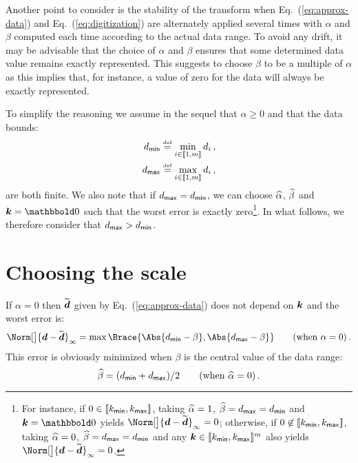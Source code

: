 \documentclass[]{article}
\newcommand*{\IntRange}[1]{[\![#1]\!]}
\renewcommand*{\proxy}[1]{\widetilde{#1}}
\begin{document}
Another point to consider is the stability of the transform when
Eq.~(\ref{eq:approx-data}) and Eq.~(\ref{eq:digitization}) are alternately
applied several times with $\alpha$ and $\beta$ computed each time according to
the actual data range.  To avoid any drift, it may be advisable that the choice
of $\alpha$ and $\beta$ ensures that some determined data value remains exactly
represented.  This suggests to choose $\beta$ to be a multiple of $\alpha$ as
this implies that, for instance, a value of zero for the data will always be
exactly represented.   

To simplify the reasoning we assume in the sequel that $\alpha \ge 0$ and that
the data bounds:
\begin{align}
   d_\Tag{min} &\bydef \min_{i\in\IntRange{1,m}} d_i \, , \\ 
   d_\Tag{max} &\bydef \max_{i\in\IntRange{1,m}} d_i \, , 
\end{align}
are both finite.  We also note that if $d_{\mathsf{max}} = d_{\mathsf{min}}$, we can
choose $\widehat{\alpha}$, $\widehat{\beta}$ and $\V k = \Zero$ such that the worst
error is exactly zero\footnote{ For instance, if $0 \in
\IntRange{k_\Tag{min},k_\Tag{max}}$, taking $\widehat{\alpha} = 1$,
$\widehat{\beta} = d_{\mathsf{max}} = d_{\mathsf{min}}$ and $\V k = \Zero$ yields
$\Norm[\big]{\V d - \proxy{\V d}}_{\infty} = 0$; otherwise, if $0 \not\in
\IntRange{k_\Tag{min},k_\Tag{max}}$, taking $\widehat{\alpha} = 0$,
$\widehat{\beta} = d_{\mathsf{max}} = d_{\mathsf{min}}$ and any $\V k \in
\IntRange{k_\Tag{min},k_\Tag{max}}^m$ also yields $\Norm[\big]{\V d - \proxy{\V
d}}_{\infty} = 0$.}.  In what follows, we therefore consider that $d_{\mathsf{max}}
> d_{\mathsf{min}}$.


\section{Choosing the scale}

If $\alpha=0$ then $\proxy{\V d}$ given by Eq.~(\ref{eq:approx-data}) does not
depend on $\boldsymbol{k}$ and the worst error is:
\begin{displaymath}
  \Norm[\big]{\V d - \proxy{\V d}}_{\infty} = \max\Brace{
    \Abs{d_\Tag{min} - \beta}, \Abs{d_\Tag{max} - \beta}
  } \qquad\text{(when $\alpha = 0$)} \, .
\end{displaymath}
This error is obviously minimized when $\beta$ is the central value of the data range:
\begin{displaymath}
  \widehat{\beta} = (d_{\mathsf{min}} + d_{\mathsf{max}})/2
  \qquad\text{(when $\widehat{\alpha} = 0$)} \, .
\end{displaymath}
\end{document}
